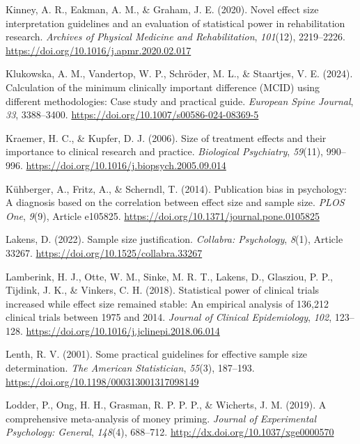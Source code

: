 \documentclass[authordate, meta, issue]{jote-new-article}
\begin{document}
	Kinney, A. R., Eakman, A. M., \& Graham, J. E. (2020). Novel effect size interpretation guidelines and an evaluation of statistical power in rehabilitation research. \emph{Archives of Physical Medicine and Rehabilitation}, \emph{101}(12), 2219--2226. \url{https://doi.org/10.1016/j.apmr.2020.02.017}



	Klukowska, A. M., Vandertop, W. P., Schröder, M. L., \& Staartjes, V. E. (2024). Calculation of the minimum clinically important difference (MCID) using different methodologies: Case study and practical guide. \emph{European Spine Journal}, \emph{33}, 3388--3400. \url{https://doi.org/10.1007/s00586-024-08369-5}



	Kraemer, H. C., \& Kupfer, D. J. (2006). Size of treatment effects and their importance to clinical research and practice. \emph{Biological Psychiatry}, \emph{59}(11), 990--996. \url{https://doi.org/10.1016/j.biopsych.2005.09.014}



	Kühberger, A., Fritz, A., \& Scherndl, T. (2014). Publication bias in psychology: A diagnosis based on the correlation between effect size and sample size. \emph{PLOS One}, \emph{9}(9), Article e105825. \url{https://doi.org/10.1371/journal.pone.0105825}



	Lakens, D. (2022). Sample size justification. \emph{Collabra: Psychology}, \emph{8}(1), Article 33267. \url{https://doi.org/10.1525/collabra.33267}



	Lamberink, H. J., Otte, W. M., Sinke, M. R. T., Lakens, D., Glasziou, P. P., Tijdink, J. K., \& Vinkers, C. H. (2018). Statistical power of clinical trials increased while effect size remained stable: An empirical analysis of 136,212 clinical trials between 1975 and 2014. \emph{Journal of Clinical Epidemiology}, \emph{102}, 123--128. \url{https://doi.org/10.1016/j.jclinepi.2018.06.014}



	Lenth, R. V. (2001). Some practical guidelines for effective sample size determination. \emph{The American Statistician}, \emph{55}(3), 187--193. \url{https://doi.org/10.1198/000313001317098149}



	Lodder, P., Ong, H. H., Grasman, R. P. P. P., \& Wicherts, J. M. (2019). A comprehensive meta-analysis of money priming. \emph{Journal of Experimental Psychology: General}, \emph{148}(4), 688--712. \url{http://dx.doi.org/10.1037/xge0000570}
\end{document}
